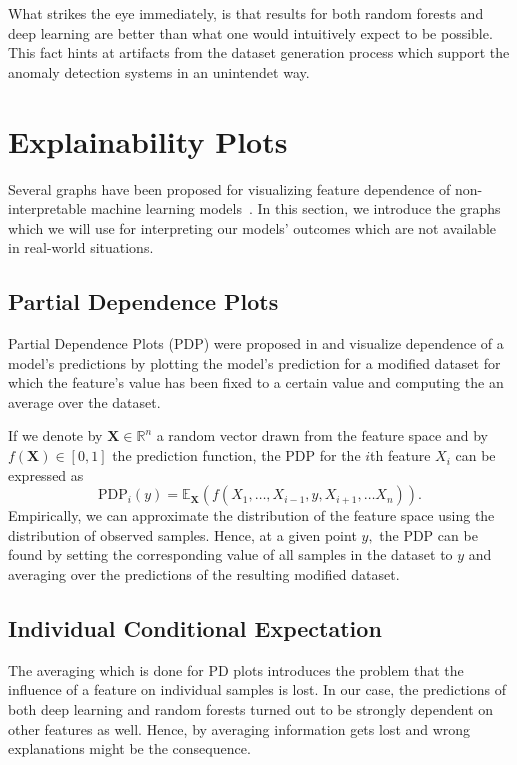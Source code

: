 \documentclass[sigconf,nonacm]{acmart}
\begin{document}
What strikes the eye immediately, is that results for both random forests and deep learning are better than what one would intuitively expect to be possible. This fact hints at artifacts from the dataset generation process which support the anomaly detection systems in an unintendet way.


\section{Explainability Plots} \label{sec:plots}
Several graphs have been proposed for visualizing feature dependence of non-interpretable machine learning models~\cite{goldstein2015peeking, friedman2001greedy, apley2016visualizing}.
In this section, we introduce the graphs which we will use for interpreting our models' outcomes which are not available in real-world situations.
\subsection{Partial Dependence Plots}
Partial Dependence Plots (PDP) were proposed in \cite{friedman2001greedy} and visualize dependence of a model's predictions by plotting the model's prediction for a modified dataset for which the feature's value has been fixed to a certain value and computing the an average over the dataset.

If we denote by $\boldsymbol X \in \mathbb R ^n$ a random vector drawn from the feature space and by $f(\boldsymbol X) \in [0,1]$ the  prediction function, the PDP for the $i$th feature $X_i$ can be expressed as
\begin{equation}
\text{PDP}_i(y) = \mathbb E_{\boldsymbol X}\left(f(X_1,\ldots,X_{i-1},y,X_{i+1},\ldots X_n)\right) . %
\end{equation}
Empirically, we can approximate the distribution of the feature space using the distribution of observed samples. Hence, at a given point $y,$ the PDP can be found by setting the corresponding value of all samples in the dataset to $y$ and averaging over the predictions of the resulting modified dataset.

\subsection{Individual Conditional Expectation}
The averaging which is done for PD plots introduces the problem that the influence of a feature on individual samples is lost. In our case, the predictions of both deep learning and random forests turned out to be strongly dependent on other features as well. Hence, by averaging information gets lost and wrong explanations might be the consequence.
\end{document}
